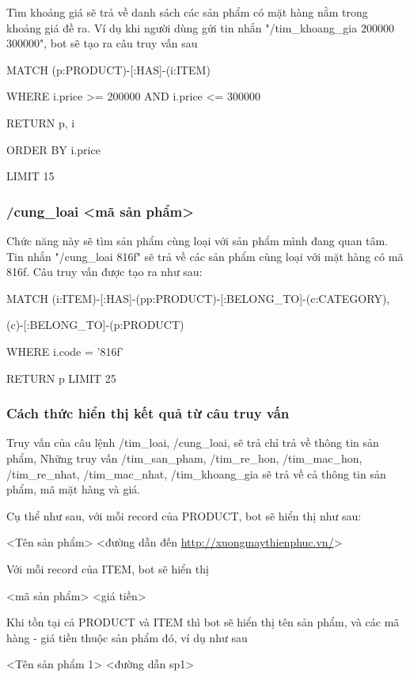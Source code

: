 Tìm khoảng giá sẽ trả về danh sách các sản phẩm có mặt hàng nằm trong khoảng giá đề ra. Ví dụ khi người dùng gửi tin nhắn "/tim\_khoang\_gia 200000 300000", bot sẽ tạo ra câu truy vấn sau 

MATCH (p:PRODUCT)-[:HAS]-(i:ITEM)  

WHERE i.price >= 200000 AND i.price <= 300000 

RETURN p, i 

ORDER BY i.price  

LIMIT 15

\subsubsection{/cung\_loai <mã sản phẩm>}

Chức năng này sẽ tìm sản phẩm cùng loại với sản phẩm mình đang quan tâm. Tin nhắn "/cung\_loai 816f" sẽ trả về các sản phẩm cùng loại với mặt hàng có mã 816f. Câu truy vấn được tạo ra như sau: 

MATCH (i:ITEM)-[:HAS]-(pp:PRODUCT)-[:BELONG\_TO]-(c:CATEGORY),

(c)-[:BELONG\_TO]-(p:PRODUCT)  

WHERE i.code = '816f'

RETURN p LIMIT 25



\subsubsection{Cách thức hiển thị kết quả từ câu truy vấn}

Truy vấn của câu lệnh /tim\_loai, /cung\_loai, sẽ trả chỉ trả về thông tin sản phẩm, Những truy vấn /tim\_san\_pham, /tim\_re\_hon, /tim\_mac\_hon, /tim\_re\_nhat, /tim\_mac\_nhat, /tim\_khoang\_gia sẽ trả về cả thông tin sản phẩm, mã mặt hàng và giá. 

Cụ thể như sau, với mỗi record của PRODUCT, bot sẽ hiển thị như sau: 

<Tên sản phẩm> <đường dẫn đến \url{http://xuongmaythienphuc.vn/}> 

\smallskip

Với mỗi record của ITEM, bot sẽ hiển thị 

<mã sản phẩm> <giá tiền> 

\smallskip 

Khi tồn tại cả PRODUCT và ITEM thì bot sẽ hiển thị tên sản phẩm, và các mã hàng - giá tiền thuộc sản phẩm đó, ví dụ như sau 

<Tên sản phẩm 1> <đường dẫn sp1> 

